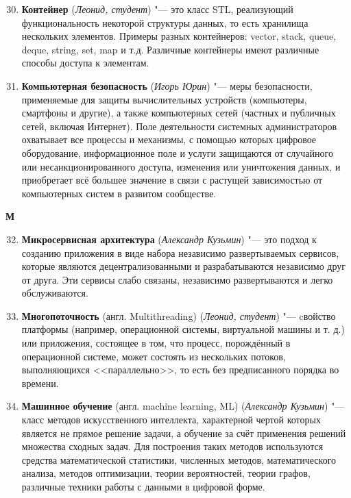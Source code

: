 \begin{enumerate}
\setcounter{enumi}{29}
    \item \textbf{Контейнер} (\textit{Леонид, студент}) "---
     это класс STL, реализующий функциональность некоторой структуры данных, то есть хранилища нескольких элементов. Примеры разных контейнеров: vector, stack, queue, deque, string, set, map и т.д. Различные контейнеры имеют различные способы доступа к элементам.

     \item \textbf{Компьютерная безопасность} (\textit{Игорь Юрин}) "--- 
    меры безопасности, применяемые для защиты вычислительных устройств (компьютеры, смартфоны и другие), а также компьютерных сетей (частных и публичных сетей, включая Интернет). Поле деятельности системных администраторов охватывает все процессы и механизмы, с помощью которых цифровое оборудование, информационное поле и услуги защищаются от случайного или несанкционированного доступа, изменения или уничтожения данных, и приобретает всё большее значение в связи с растущей зависимостью от компьютерных систем в развитом сообществе.

\end{enumerate}

\begin{flushleft} \large\textbf{М} \end{flushleft}
\begin{enumerate}
\setcounter{enumi}{31}
    \item \textbf{Микросервисная архитектура} (\textit{Александр Кузьмин}) "---
     это подход к созданию приложения в виде набора независимо развертываемых сервисов, которые являются децентрализованными и разрабатываются независимо друг от друга. Эти сервисы слабо связаны, независимо развертываются и легко обслуживаются.

     \item \textbf{Многопоточность} (англ. Multithreading) (\textit{Леонид, студент}) "--- 
      cвойство платформы (например, операционной системы, виртуальной машины и т. д.) или приложения, состоящее в том, что процесс, порождённый в операционной системе, может состоять из нескольких потоков, выполняющихся <<параллельно>>, то есть без предписанного порядка во времени.

      \item \textbf{Машинное обучение} (англ. machine learning, ML) (\textit{Александр Кузьмин}) "---
      класс методов искусственного интеллекта, характерной чертой которых является не прямое решение задачи, а обучение за счёт применения решений множества сходных задач. Для построения таких методов используются средства математической статистики, численных методов, математического анализа, методов оптимизации, теории вероятностей, теории графов, различные техники работы с данными в цифровой форме.
\end{enumerate}

